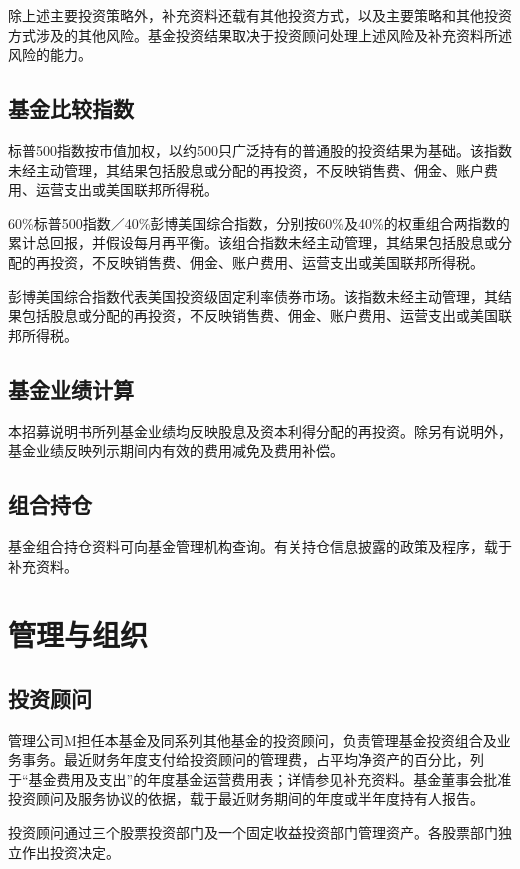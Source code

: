 \documentclass[UTF8,fontset=none,11pt,a4paper]{ctexart}
\begin{document}
除上述主要投资策略外，补充资料还载有其他投资方式，以及主要策略和其他投资方式涉及的其他风险。基金投资结果取决于投资顾问处理上述风险及补充资料所述风\allowbreak\mbox{险的能力。}


\subsection*{基金比较指数}
标普500指数按市值加权，以约500只广泛持有的普通股的投资结果为基础。该指数未经主动管理，其结果包括股息或分配的再投资，不反映销售费、佣金、账户费用、运营支出或美国联\allowbreak\mbox{邦所得税。}


60\%标普500指数／40\%彭博美国综合指数，分别按60\%及40\%的权重组合两指数的累计总回报，并假设每月再平衡。该组合指数未经主动管理，其结果包括股息或分配的再投资，不反映销售费、佣金、账户费用、运营支出或美国联\allowbreak\mbox{邦所得税。}


彭博美国综合指数代表美国投资级固定利率债券市场。该指数未经主动管理，其结果包括股息或分配的再投资，不反映销售费、佣金、账户费用、运营支出或美国联\allowbreak\mbox{邦所得税。}


\subsection*{基金业绩计算}
本招募说明书所列基金业绩均反映股息及资本利得分配的再投资。除另有说明外，基金业绩反映列示期间内有效的费用减免及\allowbreak\mbox{费用补偿。}


\subsection*{组合持仓}
基金组合持仓资料可向基金管理机构查询。有关持仓信息披露的政策及程序，载于\allowbreak\mbox{补充资料。}


\section*{管理与组织}
\subsection*{投资顾问}
管理公司M担任本基金及同系列其他基金的投资顾问，负责管理基金投资组合及业务事务。最近财务年度支付给投资顾问的管理费，占平均净资产的百分比，列于“基金费用及支出”的年度基金运营费用表；详情参见补充资料。基金董事会批准投资顾问及服务协议的依据，载于最近财务期间的年度或半年度持有人报告。


投资顾问通过三个股票投资部门及一个固定收益投资部门管理资产。各股票部门独立作出\allowbreak\mbox{投资决定。}
\end{document}
